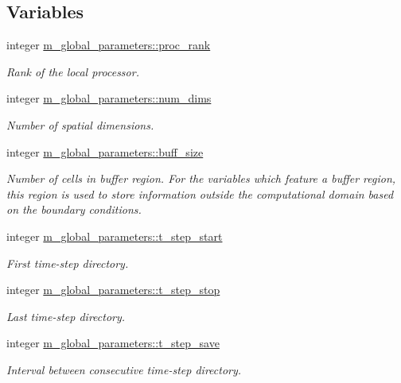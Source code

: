 \subsection*{Variables}
\begin{DoxyCompactItemize}
\item 
integer \hyperlink{namespacem__global__parameters_a383c6ff025d4ea09ddd4e2356042d86b}{m\+\_\+global\+\_\+parameters\+::proc\+\_\+rank}
\begin{DoxyCompactList}\small\item\em Rank of the local processor. \end{DoxyCompactList}\item 
integer \hyperlink{namespacem__global__parameters_a76e251296a28212df87bf9f653ff9a3b}{m\+\_\+global\+\_\+parameters\+::num\+\_\+dims}
\begin{DoxyCompactList}\small\item\em Number of spatial dimensions. \end{DoxyCompactList}\item 
integer \hyperlink{namespacem__global__parameters_a6e342ae3eb66f89e0eeb94e11aa42d92}{m\+\_\+global\+\_\+parameters\+::buff\+\_\+size}
\begin{DoxyCompactList}\small\item\em Number of cells in buffer region. For the variables which feature a buffer region, this region is used to store information outside the computational domain based on the boundary conditions. \end{DoxyCompactList}\item 
integer \hyperlink{namespacem__global__parameters_ace0c8a67825d0dccd2e23b5d0f9985c0}{m\+\_\+global\+\_\+parameters\+::t\+\_\+step\+\_\+start}
\begin{DoxyCompactList}\small\item\em First time-\/step directory. \end{DoxyCompactList}\item 
integer \hyperlink{namespacem__global__parameters_aff1140575af25247060f3e7f31a8a10f}{m\+\_\+global\+\_\+parameters\+::t\+\_\+step\+\_\+stop}
\begin{DoxyCompactList}\small\item\em Last time-\/step directory. \end{DoxyCompactList}\item 
integer \hyperlink{namespacem__global__parameters_a98b51eda2c46660b439c0a8375385165}{m\+\_\+global\+\_\+parameters\+::t\+\_\+step\+\_\+save}
\begin{DoxyCompactList}\small\item\em Interval between consecutive time-\/step directory. \end{DoxyCompactList}\item 

\end{DoxyCompactItemize}
